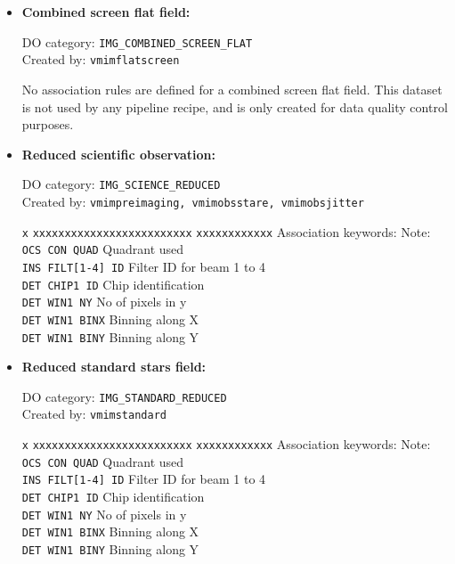 \begin{itemize}
\item {\bf Combined screen flat field:}

DO category: {\tt IMG\_COMBINED\_SCREEN\_FLAT} \\
Created by: {\tt vmimflatscreen}

No association rules are defined for a combined screen flat field.
This dataset is not used by any pipeline recipe, and is only created 
for data quality control purposes.

\item {\bf Reduced scientific observation:}

DO category: {\tt IMG\_SCIENCE\_REDUCED} \\
Created by: {\tt vmimpreimaging, vmimobsstare, vmimobsjitter}

\begin{tabbing}
{\tt x} \= {\tt xxxxxxxxxxxxxxxxxxxxxxxxx} \= {\tt xxxxxxxxxxxx} \kill
\> Association keywords: \> Note: \\
\> {\tt OCS CON QUAD} \> Quadrant used \\
\> {\tt INS FILT[1-4] ID} \> Filter ID for beam 1 to 4 \\
\> {\tt DET CHIP1 ID} \> Chip identification \\
\> {\tt DET WIN1 NY} \> No of pixels in y \\
\> {\tt DET WIN1 BINX} \> Binning along X \\
\> {\tt DET WIN1 BINY} \> Binning along Y \\
\end{tabbing}

\item {\bf Reduced standard stars field:}

DO category: {\tt IMG\_STANDARD\_REDUCED} \\
Created by: {\tt vmimstandard}

\begin{tabbing}
{\tt x} \= {\tt xxxxxxxxxxxxxxxxxxxxxxxxx} \= {\tt xxxxxxxxxxxx} \kill
\> Association keywords: \> Note: \\
\> {\tt OCS CON QUAD} \> Quadrant used \\
\> {\tt INS FILT[1-4] ID} \> Filter ID for beam 1 to 4 \\
\> {\tt DET CHIP1 ID} \> Chip identification \\
\> {\tt DET WIN1 NY} \> No of pixels in y \\
\> {\tt DET WIN1 BINX} \> Binning along X \\
\> {\tt DET WIN1 BINY} \> Binning along Y \\
\end{tabbing}


\end{itemize}
